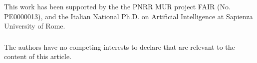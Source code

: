 \documentclass[runningheads]{llncs}
\begin{document}
\noindent











\begin{credits}

\subsubsection{\ackname} This work has been supported by the the PNRR MUR project FAIR (No. PE0000013), and the Italian National Ph.D. on Artificial Intelligence at Sapienza University of Rome.

\subsubsection{\discintname}
The authors have no competing interests to declare that are
relevant to the content of this article.

\end{credits}


%
%
%
% 
% 
%



\end{document}
